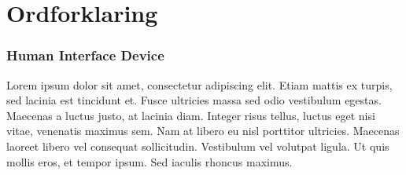 
\section{Ordforklaring}

\subsubsection{Human Interface Device}

Lorem ipsum dolor sit amet, consectetur adipiscing elit. Etiam mattis ex turpis, sed lacinia est tincidunt et. Fusce ultricies massa sed odio vestibulum egestas. Maecenas a luctus justo, at lacinia diam. Integer risus tellus, luctus eget nisi vitae, venenatis maximus sem. Nam at libero eu nisl porttitor ultricies. Maecenas laoreet libero vel consequat sollicitudin. Vestibulum vel volutpat ligula. Ut quis mollis eros, et tempor ipsum. Sed iaculis rhoncus maximus. %

\clearpage